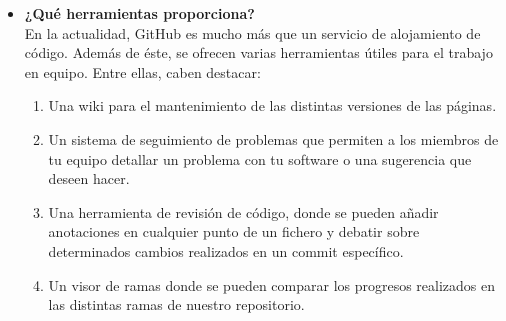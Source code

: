 \begin{itemize} %
\item \textbf{¿Qué herramientas proporciona?}\\

En la actualidad, GitHub es mucho más que un servicio de alojamiento de código. Además de éste, se ofrecen varias herramientas útiles para el trabajo en equipo. Entre ellas, caben destacar:

\begin{enumerate}[1.]

\item Una wiki para el mantenimiento de las distintas versiones de las páginas.\\

\item Un sistema de seguimiento de problemas que permiten a los miembros de tu equipo detallar un problema con tu software o una sugerencia que deseen hacer.\\

\item Una herramienta de revisión de código, donde se pueden añadir anotaciones en cualquier punto de un fichero y debatir sobre determinados cambios realizados en un commit específico.\\

\item Un visor de ramas donde se pueden comparar los progresos realizados en las distintas ramas de nuestro repositorio.\\

\end{enumerate}	
\end{itemize} 

